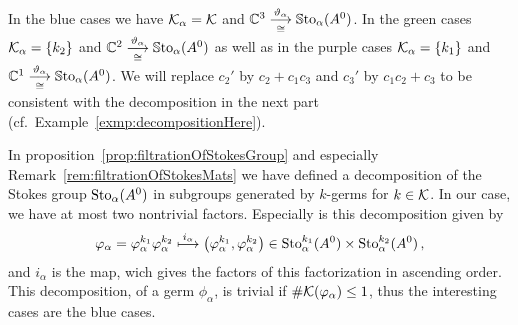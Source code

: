In the \textcolor{blue!75!black}{blue} cases we have $\mathcal{K}_\alpha=\mathcal{K}$ and
$\mathbb{C}^3\overset{\vartheta_\alpha}{\underset{\cong}{\longrightarrow}}\operatorname{\mathbb{S}to}_\alpha(A^0)$.
In the \textcolor{green!50!black}{green} cases $\mathcal{K}_\alpha=\{k_2\}$ and
$\mathbb{C}^2\overset{\vartheta_\alpha}{\underset{\cong}{\longrightarrow}}\operatorname{\mathbb{S}to}_\alpha(A^0)$
as well as in the \textcolor{purple!75!black}{purple} cases
$\mathcal{K}_\alpha=\{k_1\}$ and
$\mathbb{C}^1\overset{\vartheta_\alpha}{\underset{\cong}{\longrightarrow}}\operatorname{\mathbb{S}to}_\alpha(A^0)$.
We will replace $c_2'$ by $c_2+c_1c_3$ and $c_3'$ by $c_1c_2+c_3$ to be
consistent with the decomposition in the next part
(cf.\ Example~\ref{exmp:decompositionHere}).

In proposition~\ref{prop:filtrationOfStokesGroup} and especially
Remark~\ref{rem:filtrationOfStokesMats} we have defined a decomposition of the
Stokes group $\operatorname{Sto}_\alpha(A^0)$ in subgroups generated by $k$-germs for
$k\in\mathcal{K}$.
In our case, we have at most two nontrivial factors. Especially is this
decomposition given by
\[
  \varphi_\alpha=\varphi_\alpha^{k_1} \varphi_\alpha^{k_2}
  \overset{i_\alpha}\longmapsto
    \left(\varphi_\alpha^{k_1},\varphi_\alpha^{k_2}\right)
      \in\operatorname{Sto}_\alpha^{k_1}(A^0)\times\operatorname{Sto}_\alpha^{k_2}(A^0) \,,
\]
and $i_\alpha$ is the map, wich gives the factors of this factorization in
ascending order.
This decomposition, of a germ $\phi_\alpha$, is trivial if
$\#\mathcal{K}(\varphi_\alpha)\leq1$, thus the interesting cases are the
\textcolor{blue!75!black}{blue} cases.


